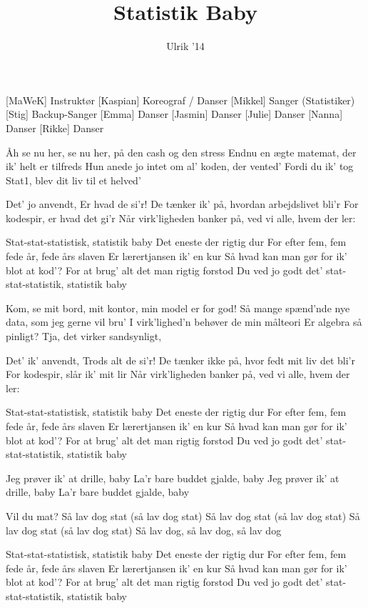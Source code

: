 \documentclass[a4paper,11pt]{article}
\title{Statistik Baby}
\author{Ulrik '14}
\begin{document}
\maketitle

\begin{roles}
[MaWeK] Instruktør
[Kaspian] Koreograf / Danser
[Mikkel] Sanger (Statistiker)
[Stig] Backup-Sanger
[Emma] Danser
[Jasmin] Danser
[Julie] Danser
[Nanna] Danser
[Rikke] Danser
\end{roles}

\begin{song}
 Åh se nu her, se nu her, på den cash og den stress
Endnu en ægte matemat, der ik' helt er tilfreds
Hun anede jo intet om al' koden, der vented'
Fordi du ik' tog Stat1, blev dit liv til et helved'

 Det' jo anvendt,
Er hvad de si'r!
De tænker ik' på, hvordan arbejdslivet bli'r
For kodespir, er hvad det gi'r
Når virk'ligheden banker på, ved vi alle, hvem der ler:

 Stat-stat-statistisk, statistik baby
Det eneste der rigtig dur
For efter fem, fem fede år, fede års slaven
Er lærertjansen ik' en kur
Så hvad kan man gør for ik' blot at kod'?
For at brug' alt det man rigtig forstod
Du ved jo godt det' stat-stat-statistik, statistik baby

 Kom, se mit bord, mit kontor, min model er for god!
Så mange spænd'nde nye data, som jeg gerne vil bru'
I virk'lighed'n behøver de min målteori
Er algebra så pinligt? Tja, det virker sandsynligt,

 Det' ik’ anvendt,
Trods alt de si'r!
De tænker ikke på, hvor fedt mit liv det bli'r
For kodespir, slår ik' mit lir
Når virk'ligheden banker på, ved vi alle, hvem der ler:

 Stat-stat-statistisk, statistik baby
Det eneste der rigtig dur
For efter fem, fem fede år, fede års slaven
Er lærertjansen ik' en kur
Så hvad kan man gør for ik' blot at kod'?
For at brug' alt det man rigtig forstod
Du ved jo godt det' stat-stat-statistik, statistik baby

 Jeg prøver ik' at drille, baby
La'r bare buddet gjalde, baby
Jeg prøver ik' at drille, baby
La'r bare buddet gjalde, baby

 Vil du mat? Så lav dog stat (så lav dog stat)
Så lav dog stat (så lav dog stat)
Så lav dog stat (så lav dog stat)
Så lav dog, så lav dog, så lav dog

 Stat-stat-statistisk, statistik baby
Det eneste der rigtig dur
For efter fem, fem fede år, fede års slaven
Er lærertjansen ik' en kur
Så hvad kan man gør for ik' blot at kod'?
For at brug' alt det man rigtig forstod
Du ved jo godt det' stat-stat-statistik, statistik baby
\end{song}
\end{document}
